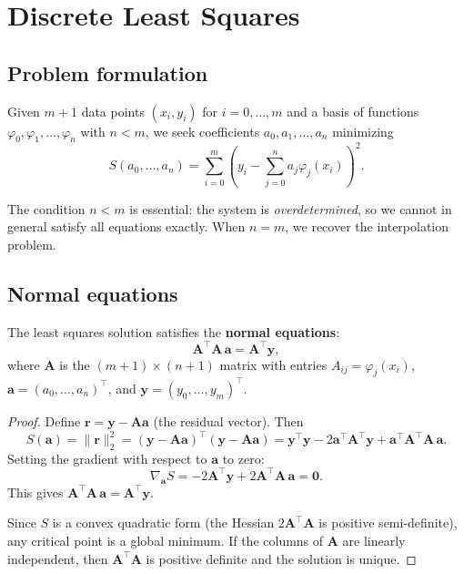 \section{Discrete Least Squares}

\subsection{Problem formulation}

\begin{definition}
\label{def:least-squares}
Given $m+1$ data points $(x_i, y_i)$ for $i = 0, \ldots, m$ and a basis of functions $\varphi_0, \varphi_1, \ldots, \varphi_n$ with $n < m$, we seek coefficients $a_0, a_1, \ldots, a_n$ minimizing
\[
    S(a_0, \ldots, a_n) = \sum_{i=0}^{m} \left( y_i - \sum_{j=0}^{n} a_j \varphi_j(x_i) \right)^2.
\]
\end{definition}

\begin{remark}
The condition $n < m$ is essential: the system is \emph{overdetermined}, so we cannot in general satisfy all equations exactly. When $n = m$, we recover the interpolation problem.
\end{remark}

\subsection{Normal equations}

\begin{theorem}
\label{thm:normal-equations}
The least squares solution satisfies the \textbf{normal equations}:
\[
    \mathbf{A}^\top \mathbf{A} \, \mathbf{a} = \mathbf{A}^\top \mathbf{y},
\]
where $\mathbf{A}$ is the $(m+1) \times (n+1)$ matrix with entries $A_{ij} = \varphi_j(x_i)$, $\mathbf{a} = (a_0, \ldots, a_n)^\top$, and $\mathbf{y} = (y_0, \ldots, y_m)^\top$.
\end{theorem}

\begin{proof}
Define $\mathbf{r} = \mathbf{y} - \mathbf{A}\mathbf{a}$ (the residual vector). Then
\[
    S(\mathbf{a}) = \|\mathbf{r}\|_2^2 = (\mathbf{y} - \mathbf{A}\mathbf{a})^\top (\mathbf{y} - \mathbf{A}\mathbf{a})
    = \mathbf{y}^\top\mathbf{y} - 2\mathbf{a}^\top\mathbf{A}^\top\mathbf{y} + \mathbf{a}^\top\mathbf{A}^\top\mathbf{A}\,\mathbf{a}.
\]
Setting the gradient with respect to $\mathbf{a}$ to zero:
\[
    \nabla_{\mathbf{a}} S = -2\mathbf{A}^\top\mathbf{y} + 2\mathbf{A}^\top\mathbf{A}\,\mathbf{a} = \mathbf{0}.
\]
This gives $\mathbf{A}^\top\mathbf{A}\,\mathbf{a} = \mathbf{A}^\top\mathbf{y}$.

Since $S$ is a convex quadratic form (the Hessian $2\mathbf{A}^\top\mathbf{A}$ is positive semi-definite), any critical point is a global minimum. If the columns of $\mathbf{A}$ are linearly independent, then $\mathbf{A}^\top\mathbf{A}$ is positive definite and the solution is unique.
\end{proof}

